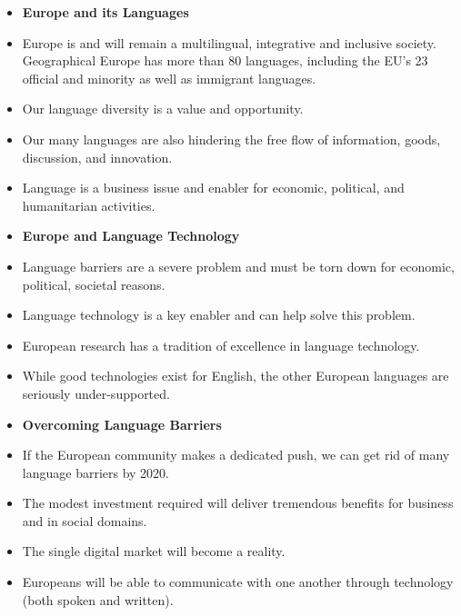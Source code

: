 \documentclass[10pt, plain]{../../metanetpaper}
\begin{document}
\vspace*{-5mm}
\begin{multicols}{2}
  \begin{itemize}
  \item[] \textbf{Europe and its Languages}
  \item Europe is and will remain a multilingual, integrative and inclusive society. Geographical Europe has more than 80 languages, including the EU's 23 official and minority as well as immigrant languages.
  \item Our language diversity is a value and opportunity.
  \item Our many languages are also hindering the free flow of information, goods, discussion, and innovation.
  \item Language is a business issue and enabler for economic, political, and humanitarian activities.
  \medskip

  \item[] \textbf{Europe and Language Technology}
  \item Language barriers are a severe problem and must be torn down for economic, political, societal reasons.
  \item Language technology is a key enabler and can help solve this problem.
  \item European research has a tradition of excellence in language technology.
  \item While good technologies exist for English, the other European languages are seriously under-supported.
  \medskip

  \item[] \textbf{Overcoming Language Barriers}
  \item If the European community makes a dedicated push, we can get rid of many language barriers by 2020.
  \item The modest investment required will deliver tremendous benefits for business and in social domains.
  \item The single digital market will become a reality.
  \item Europeans will be able to communicate with one another through technology (both spoken and written).
  \medskip


\end{itemize}
\end{multicols}
\end{document}
